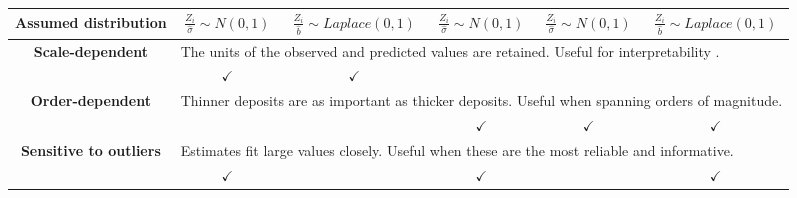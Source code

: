 {\begin{landscape}
\begin{table}[]
\begin{tabular}{@{}lcccccc@{}}
    \multicolumn{2}{c}{\textbf{Assumed distribution}}                                                           & $\frac{Z_{i}}{\hat{\sigma}} \sim N(0, 1)$                                                    & $\frac{Z_{i}}{\hat{b}} \sim Laplace(0, 1)$                                                        & $\frac{Z_{i}}{\hat{\sigma}} \sim N(0, 1)$                                                      & $\frac{Z_{i}}{\hat{\sigma}} \sim N(0, 1)$                                                                   & $\frac{Z_{i}}{\hat{b}} \sim Laplace(0, 1)$                                                                          \\ \midrule
    \multicolumn{2}{c}{\textbf{Scale-dependent}} & \multicolumn{5}{l}{The units of the observed and predicted values are retained. Useful for interpretability
    .}      \\
    \multicolumn{2}{c}{\textbf{}} & $\checkmark$                                                          & $\checkmark$                                                                     &                                                                          &                                                                                                     &                                                                                                   \\ %
    \multicolumn{2}{c}{\textbf{Order-dependent}} & \multicolumn{5}{l}{Thinner deposits are as important as thicker deposits. Useful when spanning orders of magnitude.} \\
    \multicolumn{2}{c}{\textbf{}}                                                                   &    &                                                                                  & $\checkmark$                                                             & $\checkmark$                                                                                        & $\checkmark$                                                                                      \\ \midrule
    \multicolumn{2}{c}{\textbf{Sensitive to outliers}} & \multicolumn{5}{l}{Estimates fit large values closely. Useful when these are the most reliable and informative.} \\
    \multicolumn{2}{c}{\textbf{}} & $\checkmark$                                                          &                                                                                  &   $\checkmark$                                                                       &                                                                                                     & $\checkmark$                                                                                      \\ %

\end{tabular}
\end{table}
\end{landscape}}

